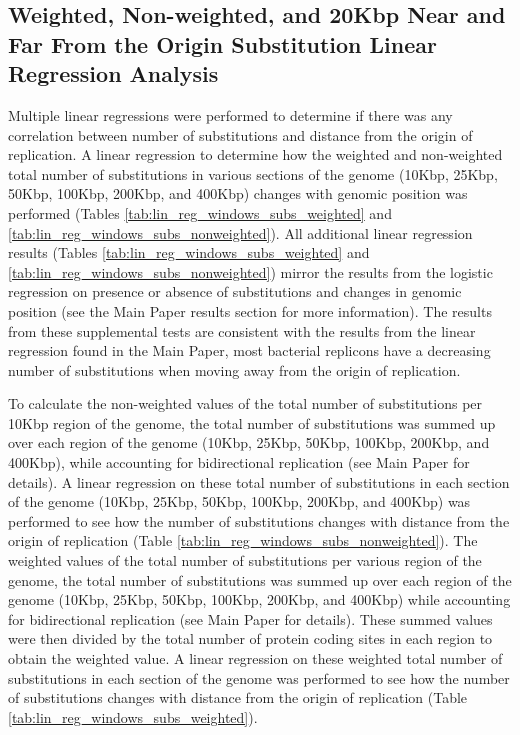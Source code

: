 \documentclass[11pt]{article}
\begin{document}
\subsection{Weighted, Non-weighted, and 20Kbp Near and Far From the Origin Substitution Linear Regression Analysis}

Multiple linear regressions were performed to determine if there was any correlation between number of substitutions and distance from the origin of replication.
A linear regression to determine how the weighted and non-weighted total number of substitutions in various sections of the genome (10Kbp, 25Kbp, 50Kbp, 100Kbp, 200Kbp, and 400Kbp) changes with genomic position was performed  (Tables \ref{tab:lin_reg_windows_subs_weighted} and \ref{tab:lin_reg_windows_subs_nonweighted}).
All additional linear regression results (Tables \ref{tab:lin_reg_windows_subs_weighted} and \ref{tab:lin_reg_windows_subs_nonweighted}) mirror the results from the logistic regression on presence or absence of substitutions and changes in genomic position (see the Main Paper results section for more information).
The results from these supplemental tests are consistent with the results from the linear regression found in the Main Paper, most bacterial replicons have a decreasing number of substitutions when moving away from the origin of replication.

To calculate the non-weighted values of the total number of substitutions per 10Kbp region of the genome, the total number of substitutions was summed up over each region of the genome (10Kbp, 25Kbp, 50Kbp, 100Kbp, 200Kbp, and 400Kbp), while accounting for bidirectional replication (see Main Paper for details).
A linear regression on these total number of substitutions in each section of the genome (10Kbp, 25Kbp, 50Kbp, 100Kbp, 200Kbp, and 400Kbp) was performed to see how the number of substitutions changes with distance from the origin of replication (Table \ref{tab:lin_reg_windows_subs_nonweighted}).
The weighted values of the total number of substitutions per various region of the genome, the total number of substitutions was summed up over each region of the genome (10Kbp, 25Kbp, 50Kbp, 100Kbp, 200Kbp, and 400Kbp) while accounting for bidirectional replication (see Main Paper for details).
These summed values were then divided by the total number of protein coding sites in each region to obtain the weighted value.
A linear regression on these weighted total number of substitutions in each section of the genome was performed to see how the number of substitutions changes with distance from the origin of replication (Table \ref{tab:lin_reg_windows_subs_weighted}).
\end{document}
